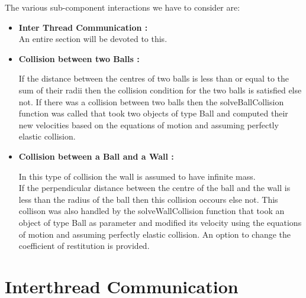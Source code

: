\documentclass[]{article}
\begin{document}
\begin{flushleft}

The various sub-component interactions we have to consider are:
\begin{itemize}

\item \textbf{Inter Thread Communication :} \\ An entire section will be devoted to this.

\item \textbf{Collision between two Balls :}\\


\begin{flushleft}

If the distance between the centres of two balls is less than or equal to the sum of their radii then the collision condition for the two balls is satisfied else not. If there was a collision between two balls then the solveBallCollision function was called that took two objects of type Ball and computed their new velocities based on the equations of motion and assuming perfectly elastic collision.

\end{flushleft}


\item \textbf{Collision between a Ball and a Wall :} \\

\begin{flushleft}

In this type of collision the wall is assumed to have infinite mass.\\

If the perpendicular distance between the centre of the ball and the wall is less than the radius of the ball then this collision occours else not. This collison was also handled by the solveWallCollision function that took an object of type Ball as parameter and modified its velocity using the equations of motion and assuming perfectly elastic collision. An option to change the coefficient of restitution is provided.

\end{flushleft}  



\end{itemize}

\end{flushleft}


\section{Interthread Communication}
\end{document}
